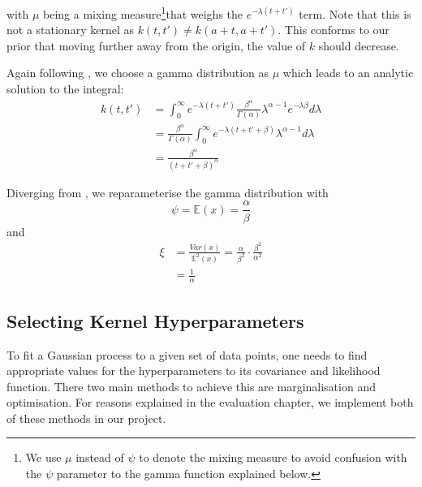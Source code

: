\documentclass[a4paper,12pt,twoside,openright]{report}
\begin{document}
with $\mu$ being a mixing measure\footnote{We use $\mu$ instead of $\psi$ to denote the mixing measure to avoid confusion with the $\psi$ parameter to the gamma function explained below.}that weighs the $e^{-\lambda(t+t')}$ term. Note that this is not a stationary kernel as $k(t, t') \neq k(a + t, a + t')$. This conforms to our prior that moving further away from the origin, the value of $k$ should decrease.

Again following \cite{2014arXiv1406.3896S}, we choose a gamma distribution as $\mu$ which leads to an analytic solution to the integral:
\begin{align}
k(t, t') &= \int_0^{\infty} e^{-\lambda(t+t')}\frac{\beta^\alpha}{\Gamma(\alpha)}\lambda^{\alpha -1}e^{-\lambda\beta} d\lambda\\
&=\frac{\beta^\alpha}{\Gamma(\alpha)}\int_0^\infty e^{-\lambda(t+t'+\beta)}\lambda^{\alpha-1}d\lambda\\
&=\frac{\beta^\alpha}{(t+t'+\beta)^\alpha}
\end{align}

Diverging from \cite{2014arXiv1406.3896S}, we reparameterise the gamma distribution with
\begin{equation}
\psi = \mathbb{E}(x) = \frac{\alpha}{\beta}
\end{equation}
and
\begin{align}
\xi &= \frac{Var(x)}{\mathbb{E}^2 (x)} = \frac{\alpha}{\beta^2} \cdot \frac{\beta^2}{\alpha^2}\\
&= \frac{1}{\alpha}
\end{align}



\subsection{Selecting Kernel Hyperparameters} 

To fit a Gaussian process to a given set of data points, one needs to find appropriate values for the hyperparameters to its covariance and likelihood function. There two main methods to achieve this are marginalisation and optimisation. For reasons explained in the evaluation chapter, we implement both of these methods in our project.
\end{document}
